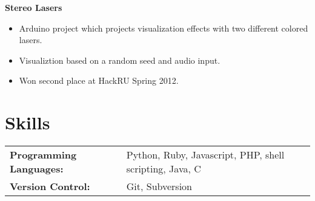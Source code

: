 \documentclass[centered,overlapped]{res}
\begin{document}
\begin{resume}
	{\bf Stereo Lasers}
	\begin{itemize} \itemsep -2pt
		\item Arduino project which projects visualization effects with two different colored lasers.
		\item Visualiztion based on a random seed and audio input.
		\item Won second place at HackRU Spring 2012.
	\end{itemize}

\section{Skills}
	\begin{tabular}{l l}
		\noindent \textbf{Programming Languages:} & Python, Ruby, Javascript, PHP, shell scripting, Java, C \\
		\noindent \textbf{Version Control:} & Git, Subversion \\
	\end{tabular}

\end{resume}
\end{document}
